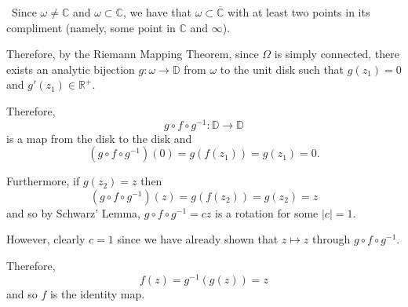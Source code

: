 \documentclass[12pt]{Homework}
\begin{document}
\begin{solution}$\,$
Since $\omega\not=\mathbb{C}$ and $\omega\subset\mathbb{C}$, we have that $\omega\subset\overline{\mathbb{C}}$ with at least two points in its compliment (namely, some point in $\mathbb{C}$ and $\infty$).

Therefore, by the Riemann Mapping Theorem, since $\Omega$ is simply connected, there exists an analytic bijection $g:\omega\to\mathbb{D}$ from $\omega$ to the unit disk such that $g(z_1)=0$ and $g'(z_1)\in\mathbb{R}^+.$

Therefore, $$g\circ f\circ g^{-1}:\mathbb{D}\to\mathbb{D}$$ is a map from the disk to the disk and $$(g\circ f\circ g^{-1})(0)=g(f(z_1))=g(z_1)=0.$$

Furthermore, if $g(z_2)=z$ then $$(g\circ f\circ g^{-1})(z)=g(f(z_2))=g(z_2)=z$$ and so by Schwarz' Lemma, $g\circ f\circ g^{-1}=cz$ is a rotation for some $|c|=1$. 

However, clearly $c=1$ since we have already shown that $z\mapsto z$ through $g\circ f\circ g^{-1}$. 

Therefore, $$f(z)=g^{-1}(g(z))=z$$ and so $f$ is the identity map.
\end{solution}
\end{document}
